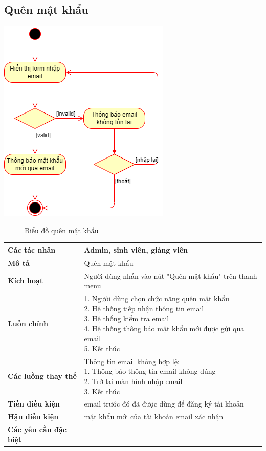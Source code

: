 \subsection{Quên mật khẩu}
  \begin{center}
    \includegraphics[width=.7\textwidth]{../drawio/activity/forgot_password.png}
    \begin{figure}[h]
      \centering
      \caption{Biểu đồ quên mật khẩu}
    \end{figure}
  \end{center}
  \begin{tabular}{|l|l|}
    \hline
    \textbf{Các tác nhân} & Admin, sinh viên, giảng viên\\
    \hline
    \textbf{Mô tả} & Quên mật khẩu\\
    \hline
    \textbf{Kích hoạt} & Người dùng nhấn vào nút "Quên mật khẩu" trên thanh menu \\
    \hline 
    \textbf{Luồn chính} & \makecell[l]{1. Người dùng chọn chức năng quên mật khẩu \\ 2. Hệ thống tiếp nhận thông tin email \\ 3. Hệ thống kiểm tra email \\ 4. Hệ thống thông báo mật khẩu mới được gửi qua email \\ 5. Kết thúc} \\
    \hline
    \textbf{Các luồng thay thế} & \makecell[l]{Thông tin email không hợp lệ: \\ 1. Thông báo thông tin email không đúng \\ 2. Trở lại màn hình nhập email \\ 3. Kết thúc} \\
    \hline
    \textbf{Tiền điều kiện} & email trước đó đã được dùng để đăng ký tài khoản \\
    \hline
    \textbf{Hậu điều kiện} & mật khẩu mới của tài khoản email xác nhận\\
    \hline
    \textbf{Các yêu cầu đặc biệt} & \\
    \hline
  \end{tabular}

